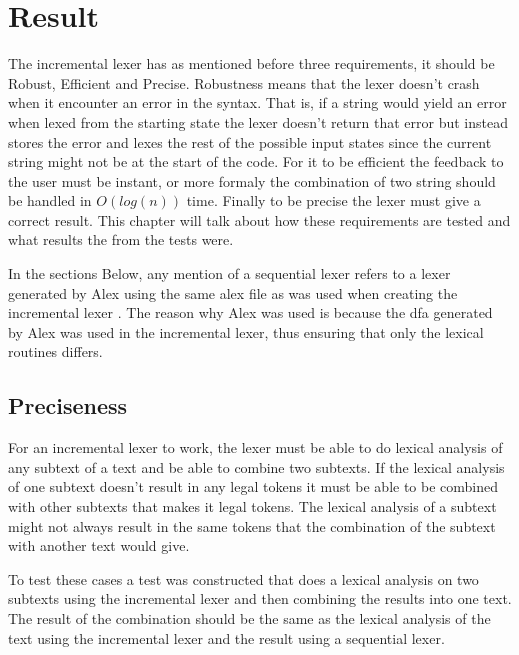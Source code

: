 \chapter{Result}
The incremental lexer has as mentioned before three requirements, it should be
Robust, Efficient and Precise. Robustness means that the lexer doesn't crash
when it encounter an error in the syntax. That is, if a string would yield an
error when lexed from the starting state the lexer doesn't return that error but
instead stores the error and lexes the rest of the possible input states since
the current string might not be at the start of the code. For it to be efficient
the feedback to the user must be instant, or more formaly the combination of two
string should be handled in $O(log(n))$ time. Finally to be precise the lexer
must give a correct result. This chapter will talk about how these requirements
are tested and what results the from the tests were.

In the sections Below, any mention of a sequential lexer refers to a lexer
generated by Alex using the same alex file as was used when creating the
incremental lexer \cite{alex}. The reason why Alex was used is because the dfa
generated by Alex was used in the incremental lexer, thus ensuring that only the
lexical routines differs.

\section{Preciseness}
For an incremental lexer to work, the lexer must be able to do lexical analysis
of any subtext of a text and be able to combine two subtexts. If the lexical
analysis of one subtext doesn't result in any legal tokens it must be able to be
combined with other subtexts that makes it legal tokens. The lexical analysis of
a subtext might not always result in the same tokens that the combination of the
subtext with another text would give.

To test these cases a test was constructed that does a lexical analysis on two
subtexts using the incremental lexer and then combining the results into one
text. The result of the combination should be the same as the lexical analysis
of the text using the incremental lexer and the result using a sequential lexer.

